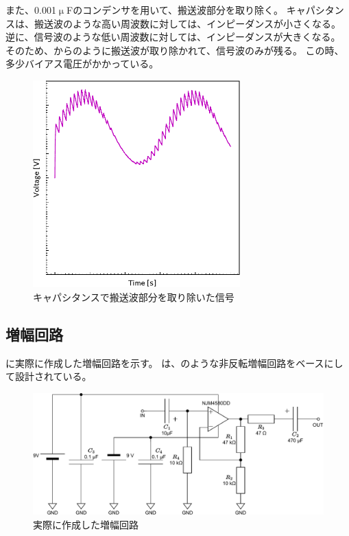 \documentclass[report.tex]{subfiles}
\begin{document}
また、0.001\(\upmu\)Fのコンデンサを用いて、搬送波部分を取り除く。
キャパシタンスは、搬送波のような高い周波数に対しては、インピーダンスが小さくなる。
逆に、信号波のような低い周波数に対しては、インピーダンスが大きくなる。
そのため、からのように搬送波が取り除かれて、信号波のみが残る。
この時、多少バイアス電圧がかかっている。

\begin{figure}[H]
	\centering
	\includegraphics[width=8cm]{fig/capa.pdf}
	\caption{キャパシタンスで搬送波部分を取り除いた信号}
	\label{fig:capa}
\end{figure}

\subsection{増幅回路}

に実際に作成した増幅回路を示す。
は、のような非反転増幅回路をベースにして設計されている。

\begin{figure}[H]
	\centering
	\includegraphics[width=15cm]{fig/amp.pdf}
	\caption{実際に作成した増幅回路}
	\label{fig:amplifier-circuit}
\end{figure}
\end{document}

